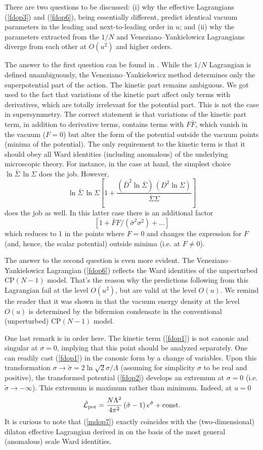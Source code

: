 \documentclass[epsfig,12pt]{article}
\def\beq{\begin{equation}}
\def\eeq{\end{equation}}
\def\beq{\begin{equation}}
\def\eeq{\end{equation}}
\begin{document}
{There are two questions to be discussed: (i) why the effective Lagrangians  (\ref{fdop3}) and (\ref{fdop6}),
 being essentially different, predict identical vacuum parameters in the leading and next-to-leading order in $u$;
 and (ii) why the  parameters extracted from the $1/N$ and Veneziano--Yankielowicz Lagrangians diverge 
 from each other at $O(u^2)$ and  higher orders.

The answer to the first question can be found in \cite{AdDVecSal}. While  the $1/N$ 
Lagrangian is defined unambiguously, the Veneziano--Yankielowicz method determines only the
superpotential part of the action. The kinetic part remains ambiguous. We got used to the fact that
variations of the kinetic part affect only terms with derivatives, which are totally irrelevant for the
potential part. This is not the case in supersymmetry.
The correct statement is that variations of the kinetic part term, in addition to derivative terms,
contains terms with $F\bar F$, which vanish in the vacuum ($F=0$) but alter the form of the potential outside
the vacuum points (minima of the potential). The only requirement to the kinetic term is that
it should obey all Ward identities (including anomalous) of the underlying microscopic theory.
For instance, in the case at hand, the simplest choice $\ln\bar\Sigma\, \ln \Sigma $
does the job. However, 
$$
\ln\bar\Sigma\, \ln \Sigma \left[1+ \frac{(\bar{D}^2 \ln\bar\Sigma)\, ({D}^2\ln \Sigma )}{\bar\Sigma\Sigma }
\right]
$$
does the job as well. In this latter case there is an additional factor
$$
\left[1 +\bar FF/(\bar\sigma^2\sigma^2)   +...  \right] $$
which reduces to 1 in the points where $F=0$ and changes the expression for $F$ (and, hence, the scalar potential)
outside minima (i.e. at $F\neq 0$).

The answer to the second question is even more evident.
The Veneziano--Yankielowicz Lagrangian (\ref{fdop6}) reflects the Ward identities
of the unperturbed CP$(N-1)$ model. That's the reason why the predictions following from this
Lagrangian fail at the level $O(u^2)$, but are valid at the level $O(u)$. 
We remind the reader that it was shown in \cite{SY1} that the vacuum energy density
at the level $O(u)$ is determined by the bifermion condensate in the 
conventional (unperturbed) CP$(N-1)$ model.

One last remark is in order here.
The kinetic term (\ref{fdop1}) is not canonic and singular at $\sigma=0$, implying that this point should be analyzed separately.
One can readily cast (\ref{fdop1}) in the canonic form by a change of variables. Upon this transformation 
$\sigma\to \tilde 
\sigma =2 \ln\sqrt{2}\sigma/\Lambda$ (assuming for simplicity $\sigma$ to be real and positive),
the transformed potential (\ref{fdop2})    develops an extremum at 
$\sigma = 0$ (i.e. $\tilde\sigma \to -\infty$). This extremum is maximum rather than minimum.
Indeed, at $u=0$
\beq
\tilde{\mathcal L}_{\rm pot} = \frac{N\Lambda^2}{4\pi^2}\,(\tilde\sigma - 1)\,e^{\tilde\sigma}
+{\rm const}.
\label{mdop7}
\eeq
It is curious to note that (\ref{mdop7}) exactly coincides with the (two-dimensional)
dilaton effective Lagrangian derived in \cite{SMMS} on the basis of the most general
(anomalous) scale Ward identities.

}
\end{document}
